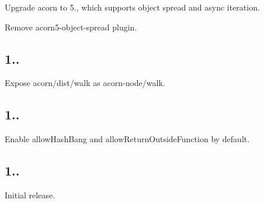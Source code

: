 \begin{DoxyItemize}
\item Upgrade acorn to 5., which supports object spread and async iteration.
\item Remove acorn5-\/object-\/spread plugin.
\end{DoxyItemize}

\subsection*{1..}


\begin{DoxyItemize}
\item Expose {\ttfamily acorn/dist/walk} as {\ttfamily acorn-\/node/walk}.
\end{DoxyItemize}

\subsection*{1..}


\begin{DoxyItemize}
\item Enable {\ttfamily allow\+Hash\+Bang} and {\ttfamily allow\+Return\+Outside\+Function} by default.
\end{DoxyItemize}

\subsection*{1..}


\begin{DoxyItemize}
\item Initial release. 
\end{DoxyItemize}